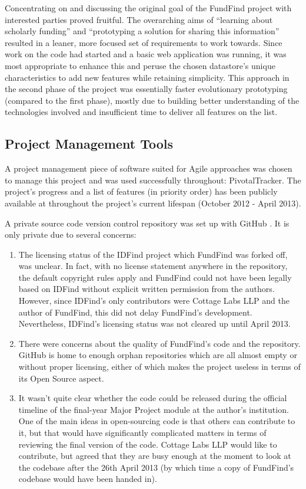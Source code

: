 Concentrating on and discussing the original goal of the FundFind project with interested parties proved fruitful. The overarching aims of ``learning about scholarly funding'' and ``prototyping a solution for sharing this information'' resulted in a leaner, more focused set of requirements to work towards. Since work on the code had started and a basic web application was running, it was most appropriate to enhance this and peruse the chosen datastore's unique characteristics to add new features while retaining simplicity. This approach in the second phase of the project was essentially faster evolutionary prototyping (compared to the first phase), mostly due to building better understanding of the technologies involved and insufficient time to deliver all features on the list.

\subsection{Project Management Tools}
\label{pm-tools}
A project management piece of software suited for Agile approaches was chosen to manage this project and was used successfully throughout: PivotalTracker. The project's progress and a list of features (in priority order) has been publicly available at \cite{pm} throughout the project's current lifespan (October 2012 - April 2013).

A private source code version control repository was set up with GitHub \cite{github}. It is only private due to several concerns:
\begin{enumerate}
 \item The licensing status of the IDFind project which FundFind was forked off, was unclear. In fact, with no license statement anywhere in the repository, the default copyright rules apply and FundFind could not have been legally based on IDFind without explicit written permission from the authors. However, since IDFind's only contributors were Cottage Labs LLP and the author of FundFind, this did not delay FundFind's development. Nevertheless, IDFind's licensing status was not cleared up until April 2013.
 
 \item There were concerns about the quality of FundFind's code and the repository. GitHub is home to enough orphan repositories which are all almost empty or without proper licensing, either of which makes the project useless in terms of its Open Source aspect.
 
 \item It wasn't quite clear whether the code could be released during the official timeline of the final-year Major Project module at the author's institution. One of the main ideas in open-sourcing code is that others can contribute to it, but that would have significantly complicated matters in terms of reviewing the final version of the code. Cottage Labs LLP would like to contribute, but agreed that they are busy enough at the moment to look at the codebase after the 26th April 2013 (by which time a copy of FundFind's codebase would have been handed in).
\end{enumerate}


